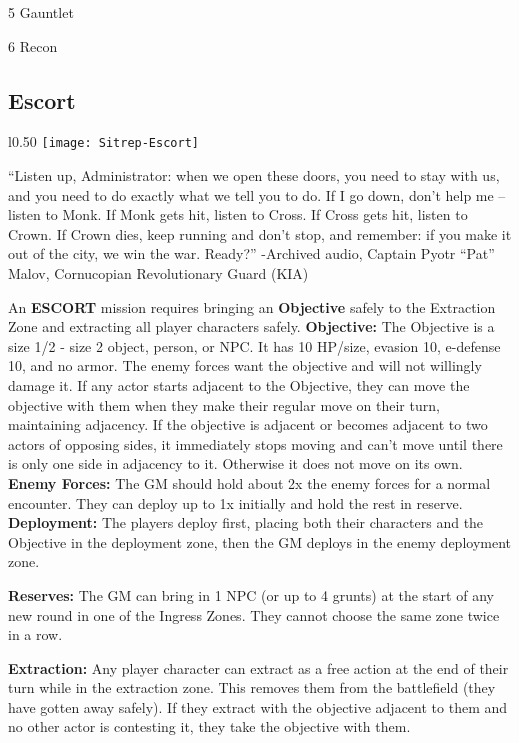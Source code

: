  5                                                      Gauntlet

 6                                                      Recon


 \subsection{Escort}
 \begin{wrapfigure}{l}{0.50\textwidth}
   \centering
   \texttt{[image: Sitrep-Escort]}
 \end{wrapfigure} 
 “Listen up, Administrator: when we open these doors, you need to stay
 with us, and you need to do exactly what we tell you to do. If I go down, don’t
 help me -- listen to Monk. If Monk gets hit, listen to Cross. If Cross gets
 hit, listen to Crown. If Crown dies, keep running and don’t stop, and remember:
 if you make it out of the city, we win the war. Ready?” -Archived audio,
 Captain Pyotr “Pat” Malov, Cornucopian Revolutionary Guard (KIA)

 An \textbf{ESCORT} mission requires bringing an \textbf{Objective} safely to the Extraction Zone
 and extracting all player characters safely.
 \textbf{Objective:} The Objective is a size 1/2 - size 2 object, person, or NPC. It has
 10 HP/size, evasion 10, e-defense 10, and no armor. The enemy forces want the
 objective and will not willingly damage it. If any actor starts adjacent to the
 Objective, they can move the objective with them when they make their regular
 move on their turn, maintaining adjacency. If the objective is adjacent or
 becomes adjacent to two actors of opposing sides, it immediately stops moving
 and can’t move until there is only one side in adjacency to it. Otherwise it
 does not move on its own.
 \textbf{Enemy Forces:} The GM should hold about 2x the enemy
 forces for a normal encounter. They can deploy up to 1x initially and hold the
 rest in reserve.
 \textbf{Deployment:} The players deploy first, placing both their
 characters and the Objective in the deployment zone, then the GM deploys in the
 enemy deployment zone.
 
 
 \textbf{Reserves:} The GM can bring in 1 NPC (or up to 4 grunts) at the start of any new
 round in one of the Ingress Zones. They cannot choose the same zone twice in a
 row.

 \textbf{Extraction:} Any player character can extract as a free action at the end of
 their turn while in the extraction zone. This removes them from the battlefield
 (they have gotten away safely). If they extract with the objective adjacent to
 them and no other actor is contesting it, they take the objective with them.

